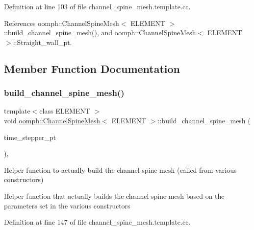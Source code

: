 Definition at line 103 of file channel\+\_\+spine\+\_\+mesh.\+template.\+cc.



References oomph\+::\+Channel\+Spine\+Mesh$<$ E\+L\+E\+M\+E\+N\+T $>$\+::build\+\_\+channel\+\_\+spine\+\_\+mesh(), and oomph\+::\+Channel\+Spine\+Mesh$<$ E\+L\+E\+M\+E\+N\+T $>$\+::\+Straight\+\_\+wall\+\_\+pt.



\subsection{Member Function Documentation}
\mbox{\label{classoomph_1_1ChannelSpineMesh_a12eae5013f54ae04f9eb1cdffacf3955}} 
\subsubsection{\texorpdfstring{build\+\_\+channel\+\_\+spine\+\_\+mesh()}{build\_channel\_spine\_mesh()}}
{\footnotesize\ttfamily template$<$class E\+L\+E\+M\+E\+NT $>$ \\
void \hyperlink{classoomph_1_1ChannelSpineMesh}{oomph\+::\+Channel\+Spine\+Mesh}$<$ E\+L\+E\+M\+E\+NT $>$\+::build\+\_\+channel\+\_\+spine\+\_\+mesh (\begin{DoxyParamCaption}\item[{Time\+Stepper $\ast$}]{time\+\_\+stepper\+\_\+pt }\end{DoxyParamCaption})\hspace{0.3cm}{\ttfamily [protected]}, {\ttfamily [virtual]}}



Helper function to actually build the channel-\/spine mesh (called from various constructors) 

Helper function that actually builds the channel-\/spine mesh based on the parameters set in the various constructors 

Definition at line 147 of file channel\+\_\+spine\+\_\+mesh.\+template.\+cc.



